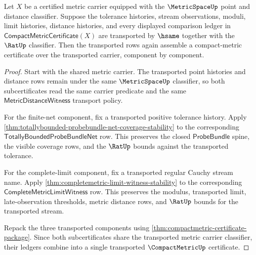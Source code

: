 \begin{theorem}
\label{thm:compactmetric-component-stability}
Let $X$ be a certified metric carrier equipped with the
$\MetricSpaceUp$ point and distance classifier. Suppose the tolerance
histories, stream observations, moduli, limit histories, distance histories,
and every displayed comparison ledger in
$\mathsf{CompactMetricCertificate}(X)$ are transported by $\hsame$ together
with the $\RatUp$ classifier. Then the transported rows again assemble a
compact-metric certificate over the transported carrier, component by
component.
\end{theorem}
\begin{proof}
Start with the shared metric carrier. The transported point histories and
distance rows remain under the same $\MetricSpaceUp$ classifier, so both
subcertificates read the same carrier predicate and the same
$\mathsf{MetricDistanceWitness}$ transport policy.

For the finite-net component, fix a transported positive tolerance history.
Apply \autoref{thm:totallybounded-probebundle-net-coverage-stability} to the
corresponding $\mathsf{TotallyBoundedProbeBundleNet}$ row. This preserves the
closed $\mathsf{ProbeBundle}$ spine, the visible coverage rows, and the
$\RatUp$ bounds against the transported tolerance.

For the complete-limit component, fix a transported regular Cauchy stream
name. Apply \autoref{thm:completemetric-limit-witness-stability} to the
corresponding $\mathsf{CompleteMetricLimitWitness}$ row. This preserves the
modulus, transported limit, late-observation thresholds, metric distance rows,
and $\RatUp$ bounds for the transported stream.

Repack the three transported components using
\autoref{thm:compactmetric-certificate-package}. Since both subcertificates
share the transported metric carrier classifier, their ledgers combine into a
single transported $\CompactMetricUp$ certificate.
\end{proof}

